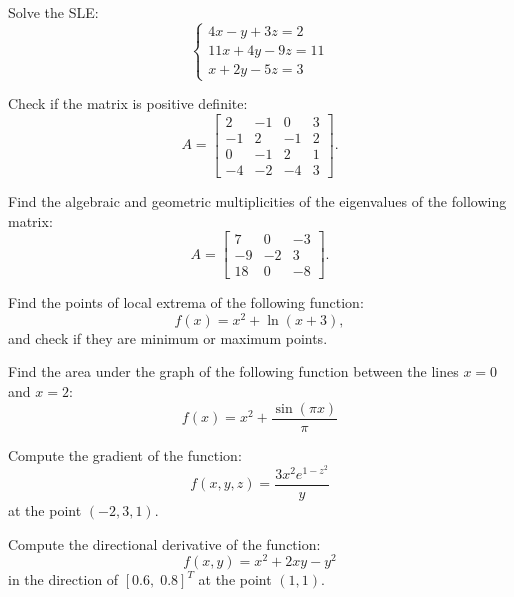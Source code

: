 \begin{problem}
Solve the SLE:
\[
\begin{cases}
    4x - y + 3z = 2\\
    11x + 4y - 9z = 11\\
    x + 2y - 5z = 3
\end{cases}
 \]
\end{problem}
\medskip


\begin{problem}
Check if the matrix is positive definite:
\[ A = \begin{bmatrix}
2& -1& 0& 3\\
-1& 2 &-1 & 2\\
0& -1& 2 & 1 \\
-4& -2& -4 & 3 
\end{bmatrix}.\]
\end{problem}
\medskip

\begin{problem}
Find the algebraic and geometric multiplicities of the eigenvalues of the following matrix:
\[ A = \begin{bmatrix}
7 &0& -3\\
-9 &-2& 3\\
18 &0& -8

\end{bmatrix}. \]
\end{problem}
\medskip


\begin{problem}
Find the points of local extrema of the following function:
\[ f(x) = x^{2}+\ln\left(x+3\right), \]
and check if they are minimum or maximum points.
\end{problem}
\medskip



\begin{problem}
Find the area under the graph of the following function between the lines $x=0$ and $x=2$:
\[ f(x) = x^{2}+\frac{\sin\left(\pi x\right)}{\pi} \]
\end{problem}
\medskip



\begin{problem}
Compute the gradient of the function:
\[ f(x,y,z) = \dfrac{3x^2e^{1-z^2}}{y} \]
at the point $(-2,3,1)$.
\end{problem}
\medskip



\begin{problem}
Compute the directional derivative of the function:
\[ f(x,y) = x^2 + 2xy - y^2 \]
in the direction of $[0.6,\;0.8]^T$ at the point $(1, 1)$.
\end{problem}
\medskip

